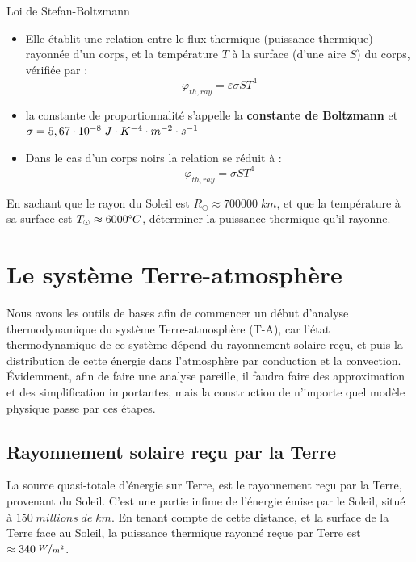 \documentclass[11pt,a4paper]{article}
\begin{document}
\begin{defn}{Loi de Stefan-Boltzmann}
\begin{itemize}
    \item Elle établit une relation entre le flux thermique (puissance thermique) rayonnée d'un corps, et la température $T$ à la surface (d'une aire $S$) du corps, vérifiée par : 
    \[ \varphi_{th,ray} = \varepsilon\sigma S T^4 \]
    \item la constante de proportionnalité s'appelle la \textbf{constante de Boltzmann} et $\sigma = 5,67\cdot10^{-8}\; J\cdot K^{-4}\cdot m^{-2}\cdot s^{-1}$
    \item Dans le cas d'un corps noirs la relation se réduit à : \[\varphi_{th,ray} = \sigma S T^4 \]
\end{itemize}
\end{defn}

\begin{exo} 
En sachant que le rayon du Soleil est $R_\odot\approx700000\; km$, et que la température à sa surface est $T_\odot\approx6000\degree C$, déterminer la puissance thermique qu'il rayonne. \vspace{3cm}
\end{exo}


\section{Le système Terre-atmosphère}

Nous avons les outils de bases afin de commencer un début d'analyse thermodynamique du système Terre-atmosphère (T-A), car l'état thermodynamique de ce système dépend du rayonnement solaire reçu, et puis la distribution de cette énergie dans l'atmosphère par conduction et la convection. Évidemment, afin de faire une analyse pareille, il faudra faire des approximation et des simplification importantes, mais la construction de n'importe quel modèle physique passe par ces étapes. 

\subsection{Rayonnement solaire reçu par la Terre}

La source quasi-totale d'énergie sur Terre, est le rayonnement reçu par la Terre, provenant du Soleil. C'est une partie infime de l'énergie émise par le Soleil, situé à $150\; millions\; de\; km$. En tenant compte de cette distance, et la surface de la Terre face au Soleil, la puissance thermique rayonné reçue par Terre est $\approx 340\; \nicefrac{W}{m^2}$.
\end{document}
